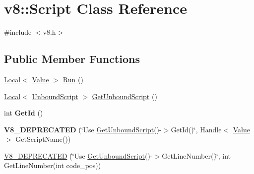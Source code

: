 \hypertarget{classv8_1_1_script}{}\section{v8\+:\+:Script Class Reference}
\label{classv8_1_1_script}


{\ttfamily \#include $<$v8.\+h$>$}

\subsection*{Public Member Functions}
\begin{DoxyCompactItemize}
\item 
\hyperlink{classv8_1_1_local}{Local}$<$ \hyperlink{classv8_1_1_value}{Value} $>$ \hyperlink{classv8_1_1_script_a5f43b29d40bd51ebad2cc275ba3898a1}{Run} ()
\item 
\hyperlink{classv8_1_1_local}{Local}$<$ \hyperlink{classv8_1_1_unbound_script}{Unbound\+Script} $>$ \hyperlink{classv8_1_1_script_afac25cad452a61897c375c2b881e2070}{Get\+Unbound\+Script} ()
\item 
\hypertarget{classv8_1_1_script_aacb1cf3b66a6542b898042689221d3d5}{}int {\bfseries Get\+Id} ()\label{classv8_1_1_script_aacb1cf3b66a6542b898042689221d3d5}

\item 
\hypertarget{classv8_1_1_script_a84ab7096e92a7a4e2b9bf618948acc99}{}{\bfseries V8\+\_\+\+D\+E\+P\+R\+E\+C\+A\+T\+E\+D} (\char`\"{}Use \hyperlink{classv8_1_1_script_afac25cad452a61897c375c2b881e2070}{Get\+Unbound\+Script}()-\/$>$Get\+Id()\char`\"{}, Handle$<$ \hyperlink{classv8_1_1_value}{Value} $>$ Get\+Script\+Name())\label{classv8_1_1_script_a84ab7096e92a7a4e2b9bf618948acc99}

\item 
\hyperlink{classv8_1_1_script_a549f4ed0ded9a3f9d8ffec541d7b5277}{V8\+\_\+\+D\+E\+P\+R\+E\+C\+A\+T\+E\+D} (\char`\"{}Use \hyperlink{classv8_1_1_script_afac25cad452a61897c375c2b881e2070}{Get\+Unbound\+Script}()-\/$>$Get\+Line\+Number()\char`\"{}, int Get\+Line\+Number(int code\+\_\+pos))
\end{DoxyCompactItemize}

